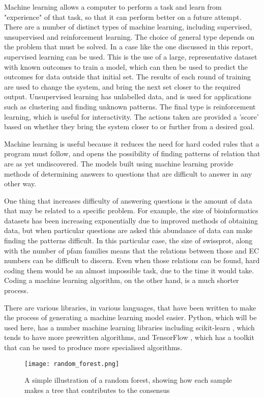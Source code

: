 \documentclass[12pt]{report}
\begin{document}
		Machine learning allows a computer to perform a task and learn from "experience" of that task, so that it can perform better on a future attempt.  There are a number of distinct types of machine learning, including supervised, unsupervised and reinforcement learning.  The choice of general type depends on the problem that must be solved.  In a case like the one discussed in this report, supervised learning can be used.  This is the use of a large, representative dataset with known outcomes to train a model, which can then be used to predict the outcomes for data outside that initial set.  The results of each round of training are used to change the system, and bring the next set closer to the required output.  Unsupervised learning has unlabelled data, and is used for applications such as clustering and finding unknown patterns.  The final type is reinforcement learning, which is useful for interactivity.  The actions taken are provided a 'score' based on whether they bring the system closer to or further from a desired goal.  
		
		Machine learning is useful because it reduces the need for hard coded rules that a program must follow, and opens the possibility of finding patterns of relation that are as yet undiscovered.  The models built using machine learning provide methods of determining answers to questions that are difficult to answer in any other way.  
		
		One thing that increases difficulty of answering questions is the amount of data that may be related to a specific problem.  For example, the size of bioinformatics datasets has been increasing exponentially due to improved methods of obtaining data, but when particular questions are asked this abundance of data can make finding the patterns difficult.  In this particular case, the size of swissprot, along with the number of pfam families means that the relations between those and EC numbers can be difficult to discern.  Even when those relations can be found, hard coding them would be an almost impossible task, due to the time it would take.  Coding a machine learning algorithm, on the other hand, is a much shorter process.
		
		There are various libraries, in various languages, that have been written to make the process of generating a machine learning model easier.  Python, which will be used here, has a number machine learning libraries including scikit-learn \citep{RefWorks:doc:5d80f150e4b07f40b9eab2f8}, which tends to have more prewritten algorithms, and TensorFlow \citep{RefWorks:doc:5d80f20de4b08a779635c81d}, which has a toolkit that can be used to produce more specialised algorithms. %
		\begin{wrapfigure}{R}{0.6\textwidth}
			\centering
			\texttt{[image: random\_forest.png]}
			\caption{A simple illustration of a random forest, showing how each sample makes a tree that contributes to the consensus}
			\label{Figure: Random Forest}
		\end{wrapfigure}
		
\end{document}
